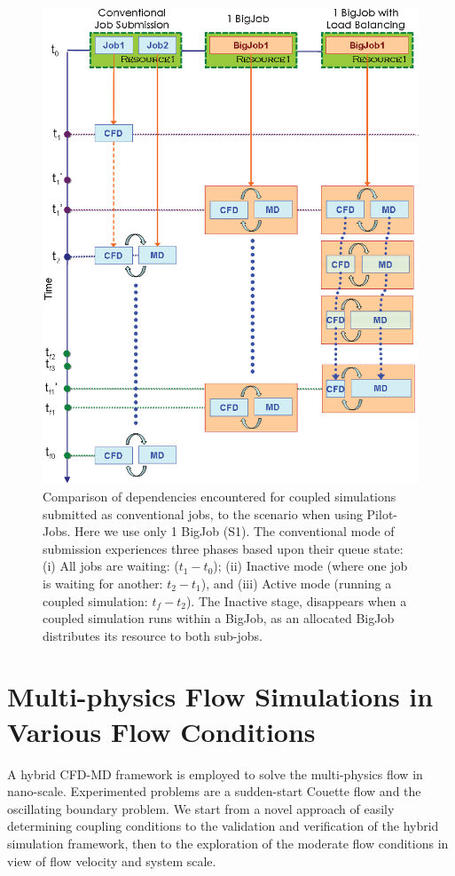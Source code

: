 \documentclass[preprint,12pt]{elsarticle}
\begin{document}
\begin{figure}
\centering
\includegraphics[width=0.8\linewidth]{Simulation_Time_of_One_BigJob.eps}
\caption{\small Comparison of dependencies encountered for coupled
  simulations submitted as conventional jobs, to the scenario when
  using Pilot-Jobs. Here we use only 1 BigJob (S1). The conventional
  mode of submission experiences three phases based upon their queue
  state: (i) All jobs are waiting: ($t_1-t_0$); (ii) Inactive mode
  (where one job is waiting for another: $t_2-t_1$), and (iii) Active
  mode (running a coupled simulation: $t_f-t_2$). The Inactive stage,
  disappears when a coupled simulation runs within a BigJob, as an
  allocated BigJob distributes its resource to both sub-jobs.}
\label{Fig:OneBJ_Flow}
\vspace{-1em}
\end{figure}



\section{Multi-physics Flow Simulations in Various Flow Conditions}
A hybrid CFD-MD framework is employed to solve the multi-physics flow in nano-scale. Experimented problems are a sudden-start Couette flow and the oscillating boundary problem. We start from a novel approach of easily determining coupling conditions to the validation and verification of the hybrid simulation framework, then to the exploration of the moderate flow conditions in view of flow velocity and system scale.
\end{document}
